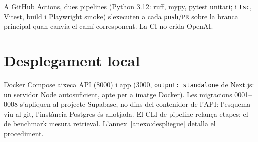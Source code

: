 A GitHub Actions, dues pipelines (Python 3.12: ruff, mypy, pytest unitari; i \texttt{tsc}, Vitest, build i Playwright smoke) s'executen a cada \texttt{push}/\texttt{PR} sobre la branca principal quan canvia el camí corresponent. La CI no crida OpenAI.

\section{Desplegament local}

Docker Compose aixeca API (8000) i app (3000, \texttt{output: standalone} de Next.js: un servidor Node autosuficient, apte per a imatge Docker). Les migracions 0001--0008 s'apliquen al projecte Supabase, no dins del contenidor de l'API: l'esquema viu al git, l'instància Postgres és allotjada. El CLI de pipeline relança etapes; el de benchmark mesura retrieval. L'annex~\ref{anexo:despliegue} detalla el procediment.

